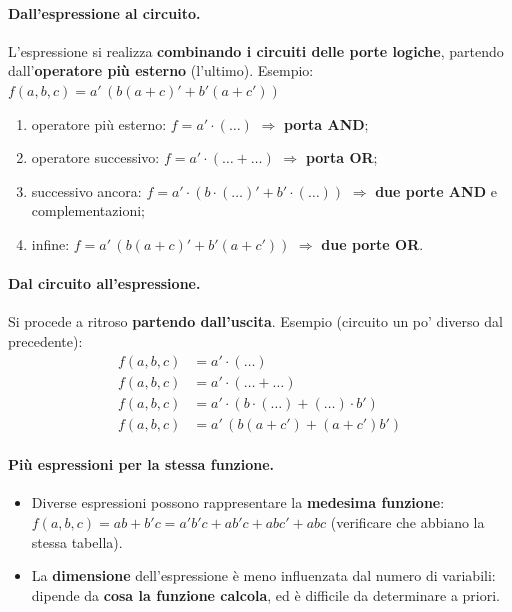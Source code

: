 \documentclass[12pt, a4paper]{article}
\begin{document}
\paragraph{Dall'espressione al circuito.} L'espressione si realizza \textbf{combinando i circuiti delle porte logiche}, partendo dall'\textbf{operatore più esterno} (l'ultimo). Esempio: $f(a,b,c) = a'\,(b(a+c)' + b'(a+c'))$
\begin{enumerate}
    \item operatore più esterno: $f = a' \cdot (\dots)$ $\Rightarrow$ \textbf{porta AND};
    \item operatore successivo: $f = a' \cdot (\dots + \dots)$ $\Rightarrow$ \textbf{porta OR};
    \item successivo ancora: $f = a' \cdot (b \cdot (\dots)' + b' \cdot (\dots))$ $\Rightarrow$ \textbf{due porte AND} e complementazioni;
    \item infine: $f = a'\,(b(a+c)' + b'(a+c'))$ $\Rightarrow$ \textbf{due porte OR}.
\end{enumerate}

\paragraph{Dal circuito all'espressione.} Si procede a ritroso \textbf{partendo dall'uscita}. Esempio (circuito un po' diverso dal precedente):
\begin{align*}
f(a,b,c) &= a' \cdot (\dots) \\
f(a,b,c) &= a' \cdot (\dots + \dots) \\
f(a,b,c) &= a' \cdot (b \cdot (\dots) + (\dots) \cdot b') \\
f(a,b,c) &= a'\,(b(a+c') + (a+c')b')
\end{align*}

\paragraph{Più espressioni per la stessa funzione.}
\begin{itemize}
    \item Diverse espressioni possono rappresentare la \textbf{medesima funzione}: $f(a,b,c) = ab + b'c = a'b'c + ab'c + abc' + abc$ (verificare che abbiano la stessa tabella).
    \item La \textbf{dimensione} dell'espressione è meno influenzata dal numero di variabili: dipende da \textbf{cosa la funzione calcola}, ed è difficile da determinare a priori.
\end{itemize}
\end{document}

